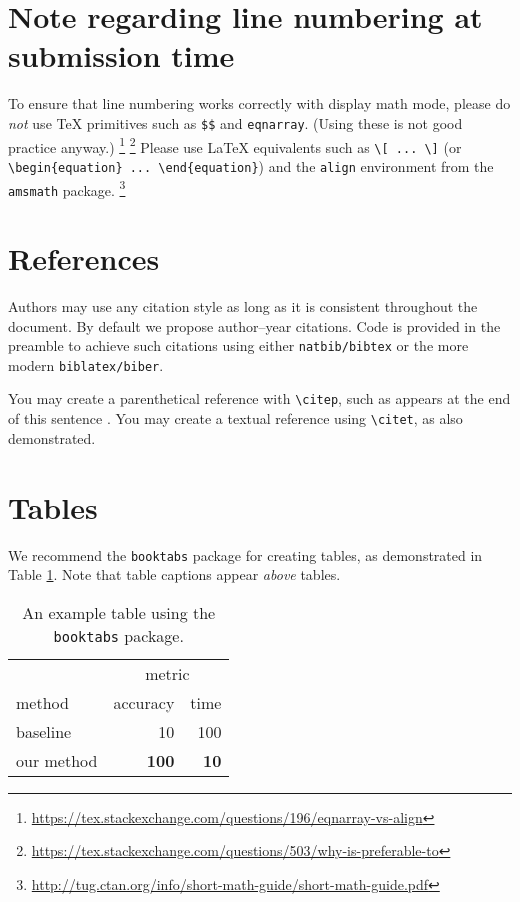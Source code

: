 \documentclass[11pt]{article}
\begin{document}
\section{Note regarding line numbering at submission time}

To ensure that line numbering works correctly with display math mode, please do
\emph{not} use \TeX{} primitives such as \verb|$$| and \texttt{eqnarray}.  (Using
these is not good practice anyway.)%
%
\footnote{\url{https://tex.stackexchange.com/questions/196/eqnarray-vs-align}}%
\footnote{\url{https://tex.stackexchange.com/questions/503/why-is-preferable-to}}
%
Please use \LaTeX{} equivalents such as \verb|\[ ... \]| (or
\verb|\begin{equation} ... \end{equation}|) and the \texttt{align} environment
from the \texttt{amsmath} package.%
%
\footnote{\url{http://tug.ctan.org/info/short-math-guide/short-math-guide.pdf}}

\section{References}

Authors may use any citation style as long as it is consistent throughout the
document. By default we propose author--year citations. Code is provided in the
preamble to achieve such citations using either \texttt{natbib/bibtex} or the
more modern \texttt{biblatex/biber}.

You may create a parenthetical reference with \verb|\citep|, such as appears at
the end of this sentence \citep{example_book}.  You may create a textual
reference using \verb|\citet|, as \citet{example_book} also demonstrated.

\section{Tables}

We recommend the \texttt{booktabs} package for creating tables, as demonstrated
in Table \ref{example_table}. Note that table captions appear \emph{above} tables.

\begin{table}
  \caption{An example table using the \texttt{booktabs} package.}
  \label{example_table}
  \centering
  \begin{tabular}{lrr}
    \toprule
    & \multicolumn{2}{c}{metric} \\
    \cmidrule{2-3}
    method & accuracy & time \\
    \midrule
    baseline & 10 & 100 \\
    our method & \textbf{100} & \textbf{10} \\
    \bottomrule
  \end{tabular}
\end{table}
\end{document}
